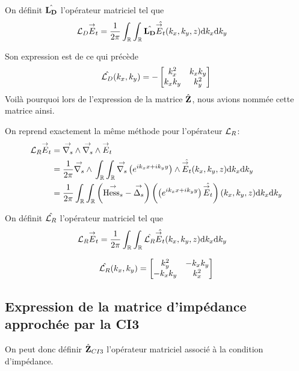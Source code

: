     On définit \(\hat{\mathbf{L_D}}\) l'opérateur matriciel tel que
    \begin{align}
      {\mathcal{L}_D} {\overset{\rightarrow}{E}}_t
      &= \dfrac{1}{2\pi}\int_\mathbb R\int_\mathbb R \hat{\mathbf{L_D}} \hat{{\overset{\rightarrow}{E}}_t}(k_x,k_y,z)\mathrm{d}{k_x}\mathrm{d}{k_y}
    \end{align}

    Son expression est de ce qui précède
    \begin{equation}
      \label{eq:plan:fourier:LD}
      \hat{{\mathcal{L}_D}}(k_x,k_y) = -
      \begin{bmatrix}
        k_x^2 & k_x k_y
        \\
        k_x k_y & k_y^2
      \end{bmatrix}
    \end{equation}
    Voilà pourquoi lors de l'expression de la matrice \(\hat{\mathbf{Z}}\), nous avions nommée cette matrice ainsi.

    On reprend exactement la même méthode pour l'opérateur \({\mathcal{L}_R}\):
    \begin{align}
      {\mathcal{L}_R} {\overset{\rightarrow}{E}}_t & = {\overset{\rightarrow}{\nabla_s}} \wedge{} {\overset{\rightarrow}{\nabla_s}} \wedge{} {\overset{\rightarrow}{E}}_t
      \\
      &=\dfrac{1}{2\pi}{\overset{\rightarrow}{\nabla_s}} \wedge{} \int_\mathbb R\int_\mathbb R {\overset{\rightarrow}{\nabla_s}}{}\left(e^{ik_xx + ik_yy}\right) \wedge \hat{{\overset{\rightarrow}{E}}_t}(k_x,k_y,z)\mathrm{d}{k_x}\mathrm{d}{k_y}
      \\
      &= \dfrac{1}{2\pi}\int_\mathbb R \int_\mathbb R \left({\overset{\rightarrow}{\operatorname{Hess}_s}} - {\overset{\rightarrow}{\Delta_s}}\right) \left(\left(e^{ik_xx + ik_yy}\right) \hat{{\overset{\rightarrow}{E}}_t}\right)(k_x,k_y,z)\mathrm{d}{k_x}\mathrm{d}{k_y}
    \end{align}

    On définit \(\hat{{\mathcal{L}_R}}\) l'opérateur matriciel tel que
    \begin{align}
      {\mathcal{L}_R} {\overset{\rightarrow}{E}}_t
      &= \dfrac{1}{2\pi}\int_\mathbb R\int_\mathbb R \hat{{\mathcal{L}_R}} \hat{{\overset{\rightarrow}{E}}_t}(k_x,k_y,z)\mathrm{d}{k_x}\mathrm{d}{k_y}
    \end{align}

    \begin{equation}
      \hat{{\mathcal{L}_R}}(k_x,k_y) =
      \begin{bmatrix}
        k_y^2 & -k_x k_y
        \\
        -k_x k_y & k_x^2
      \end{bmatrix}
    \end{equation}

  \subsection{Expression de la matrice d'impédance approchée par la CI3}

    On peut donc définir \(\hat{\mathbf{Z}}_{CI3}\) l’opérateur matriciel associé à la condition d'impédance.

